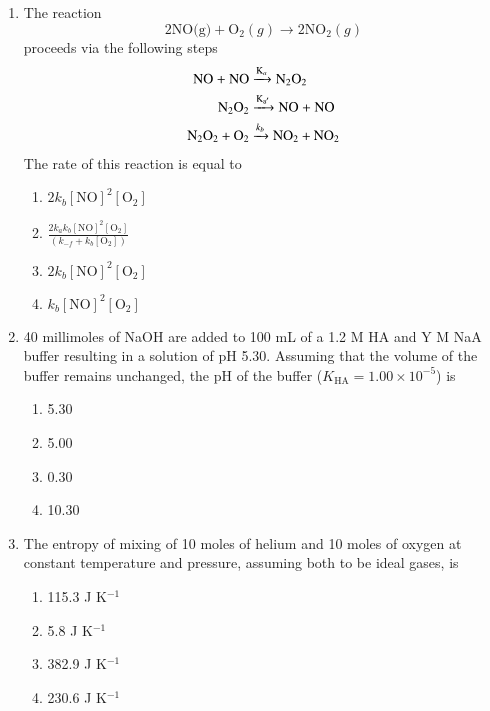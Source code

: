 \documentclass[journal,12pt,onecolumn]{IEEEtran}
\theoremstyle{remark}
\begin{document}
\begin{enumerate}
\item  The reaction \hfill{}
\[
\text{2NO(g)} + \text{O}_2(g) \rightarrow \text{2NO}_2(g)
\]
proceeds via the following steps \hfill{   }
\[
\begin{aligned}
\text{NO + NO} &\xrightarrow{\ce{K_a}} \text{N}_2\text{O}_2 \\
\text{N}_2\text{O}_2 &\xrightarrow{\ce{K_{a'}}} \text{NO + NO} \\
\text{N}_2\text{O}_2 + \text{O}_2 &\xrightarrow{k_b} \text{NO}_2 + \text{NO}_2
\end{aligned}
\]
The rate of this reaction is equal to \hfill{   }
\begin{multicols}{2}
\begin{enumerate}
    \item $2k_b[\text{NO}]^2[\text{O}_2]$
    \item $\frac{2k_a k_b[\text{NO}]^2[\text{O}_2]}{(k_{-f}+k_b[\text{O}_2])}$
    \item $2k_b[\text{NO}]^2[\text{O}_2]$
    \item $k_b[\text{NO}]^2[\text{O}_2]$
\end{enumerate}
\end{multicols}

\item  40 millimoles of NaOH are added to 100 mL of a 1.2 M HA and Y M NaA buffer resulting in a solution of pH 5.30. Assuming that the volume of the buffer remains unchanged, the pH of the buffer ($K_\text{HA} = 1.00 \times 10^{-5}$) is\hfill{}
\begin{multicols}{4}
\begin{enumerate}
    \item 5.30
    \item 5.00
    \item 0.30
    \item 10.30
\end{enumerate}
\end{multicols}

\item  The entropy of mixing of 10 moles of helium and 10 moles of oxygen at constant temperature and pressure, assuming both to be ideal gases, is\hfill{}
\begin{multicols}{2}
\begin{enumerate}
    \item 115.3 J K$^{-1}$
    \item 5.8 J K$^{-1}$
    \item 382.9 J K$^{-1}$
    \item 230.6 J K$^{-1}$
\end{enumerate}
\end{multicols}


\end{enumerate}
\end{document}
